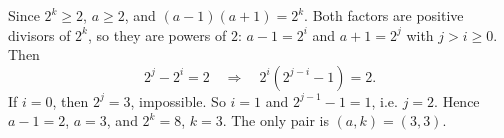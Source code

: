 Since $2^k\ge2$, $a\ge2$, and $(a-1)(a+1)=2^k$. Both factors are positive divisors of $2^k$, so they are powers of $2$: $a-1=2^i$ and $a+1=2^j$ with $j>i\ge0$. Then
\[2^j-2^i=2\quad\Longrightarrow\quad2^i\left(2^{j-i}-1\right)=2.\]
If $i=0$, then $2^j=3$, impossible. So $i=1$ and $2^{j-1}-1=1$, i.e. $j=2$. Hence $a-1=2$, $a=3$, and $2^k=8$, $k=3$. The only pair is $\boxed{(a,k)=(3,3)}$.
